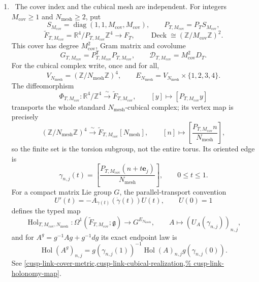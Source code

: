 \begin{enumerate}[leftmargin=1.8em]
\item \Verified\ The cover index and the cubical mesh are independent.
For integers \(M_{\mathrm{cov}}\ge1\) and
\(N_{\mathrm{mesh}}\ge2\), put
\[
 S_{M_{\mathrm{cov}}}=\operatorname{diag}(1,1,M_{\mathrm{cov}},
 M_{\mathrm{cov}}),\qquad
 P_{T,M_{\mathrm{cov}}}=P_TS_{M_{\mathrm{cov}}},
\]
\[
 \widetilde F_{T,M_{\mathrm{cov}}}
 =\mathbb R^4/P_{T,M_{\mathrm{cov}}}\mathbb Z^4
 \longrightarrow F_T,\qquad
 \operatorname{Deck}\cong(\mathbb Z/M_{\mathrm{cov}}\mathbb Z)^2.
\]
This cover has degree \(M_{\mathrm{cov}}^2\), Gram matrix and covolume
\[
 G_{T,M_{\mathrm{cov}}}
 =P_{T,M_{\mathrm{cov}}}^{\mathsf T}P_{T,M_{\mathrm{cov}}},
 \qquad
 \mathcal D_{T,M_{\mathrm{cov}}}=M_{\mathrm{cov}}^2D_T.
\]
For the cubical complex write, once and for all,
\[
 V_{N_{\mathrm{mesh}}}
   =(\mathbb Z/N_{\mathrm{mesh}}\mathbb Z)^4,\qquad
 E_{N_{\mathrm{mesh}}}
   =V_{N_{\mathrm{mesh}}}\times\{1,2,3,4\}.
\]
The diffeomorphism
\[
 \Phi_{T,M_{\mathrm{cov}}}:\mathbb R^4/\mathbb Z^4
 \xrightarrow{\ \sim\ }\widetilde F_{T,M_{\mathrm{cov}}},
 \qquad[y]\longmapsto[P_{T,M_{\mathrm{cov}}}y]
\]
transports the whole standard \(N_{\mathrm{mesh}}\)-cubical complex; its
vertex map is precisely
\[
 (\mathbb Z/N_{\mathrm{mesh}}\mathbb Z)^4
 \xrightarrow{\ \sim\ }
 \widetilde F_{T,M_{\mathrm{cov}}}[N_{\mathrm{mesh}}],
 \qquad[n]\longmapsto
 \left[\frac{P_{T,M_{\mathrm{cov}}}n}{N_{\mathrm{mesh}}}\right],
\]
so the finite set is the torsion subgroup, not the entire torus.  Its
oriented edge is
\[
 \gamma_{n,j}(t)=
 \left[\frac{P_{T,M_{\mathrm{cov}}}(n+t\mathbf e_j)}
 {N_{\mathrm{mesh}}}\right],\qquad0\le t\le1.
\]
For a compact matrix Lie group \(G\), the parallel-transport convention
\[
 U'(t)=-A_{\gamma(t)}(\dot\gamma(t))U(t),\qquad U(0)=1
\]
defines the typed map
\[
 \operatorname{Hol}_{T,M_{\mathrm{cov}},N_{\mathrm{mesh}}}:
 \Omega^1(\widetilde F_{T,M_{\mathrm{cov}}};\mathfrak g)
 \longrightarrow G^{E_{N_{\mathrm{mesh}}}},
 \qquad A\longmapsto(U_A(\gamma_{n,j}))_{n,j},
\]
and for \(A^g=g^{-1}Ag+g^{-1}dg\) its exact endpoint law is
\[
 \operatorname{Hol}(A^g)_{n,j}
 =g(\gamma_{n,j}(1))^{-1}\operatorname{Hol}(A)_{n,j}
  g(\gamma_{n,j}(0)).
\]
See \cref{cusp-link-cover-metric,cusp-link-cubical-realization,%
cusp-link-holonomy-map}.


\end{enumerate}
